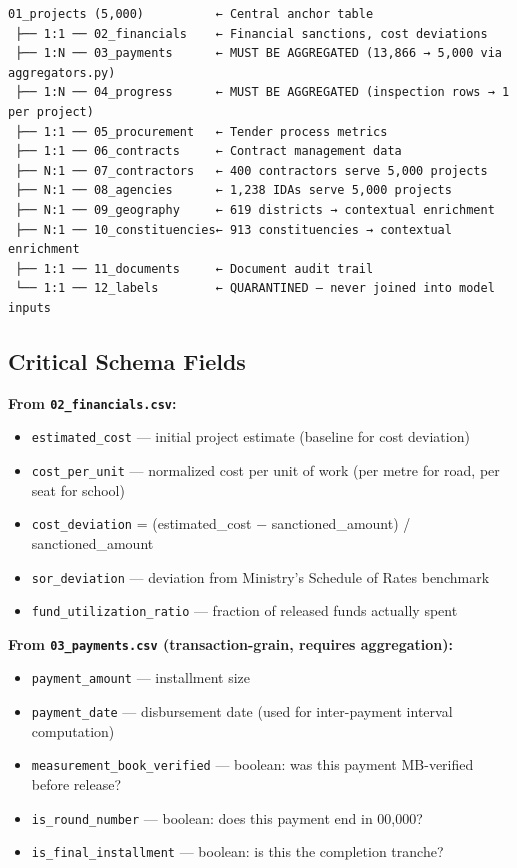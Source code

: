 \documentclass[11pt,a4paper]{article}
\begin{document}
\begin{tcolorbox}[colback=gray!5!white,colframe=gray!60!black,arc=1mm,boxrule=0.6pt,left=6pt,right=6pt,top=6pt,bottom=6pt]
\begin{lstlisting}[basicstyle=\ttfamily\scriptsize,breaklines=true,columns=flexible]
01_projects (5,000)          ← Central anchor table
 ├── 1:1 ── 02_financials    ← Financial sanctions, cost deviations
 ├── 1:N ── 03_payments      ← MUST BE AGGREGATED (13,866 → 5,000 via aggregators.py)
 ├── 1:N ── 04_progress      ← MUST BE AGGREGATED (inspection rows → 1 per project)
 ├── 1:1 ── 05_procurement   ← Tender process metrics
 ├── 1:1 ── 06_contracts     ← Contract management data
 ├── N:1 ── 07_contractors   ← 400 contractors serve 5,000 projects
 ├── N:1 ── 08_agencies      ← 1,238 IDAs serve 5,000 projects
 ├── N:1 ── 09_geography     ← 619 districts → contextual enrichment
 ├── N:1 ── 10_constituencies← 913 constituencies → contextual enrichment
 ├── 1:1 ── 11_documents     ← Document audit trail
 └── 1:1 ── 12_labels        ← QUARANTINED — never joined into model inputs
\end{lstlisting}
\end{tcolorbox}


\subsection{Critical Schema Fields}

\textbf{From \texttt{02\_financials.csv}:}
\begin{itemize}[leftmargin=1.5em, itemsep=2pt, topsep=3pt]
\item \texttt{estimated\_cost} --- initial project estimate (baseline for cost deviation)
\item \texttt{cost\_per\_unit} --- normalized cost per unit of work (per metre for road, per seat for school)
\item \texttt{cost\_deviation} = (estimated\_cost − sanctioned\_amount) / sanctioned\_amount
\item \texttt{sor\_deviation} --- deviation from Ministry's Schedule of Rates benchmark
\item \texttt{fund\_utilization\_ratio} --- fraction of released funds actually spent
\end{itemize}

\textbf{From \texttt{03\_payments.csv} (transaction-grain, requires aggregation):}
\begin{itemize}[leftmargin=1.5em, itemsep=2pt, topsep=3pt]
\item \texttt{payment\_amount} --- installment size
\item \texttt{payment\_date} --- disbursement date (used for inter-payment interval computation)
\item \texttt{measurement\_book\_verified} --- boolean: was this payment MB-verified before release?
\item \texttt{is\_round\_number} --- boolean: does this payment end in 00,000?
\item \texttt{is\_final\_installment} --- boolean: is this the completion tranche?
\end{itemize}
\end{document}

